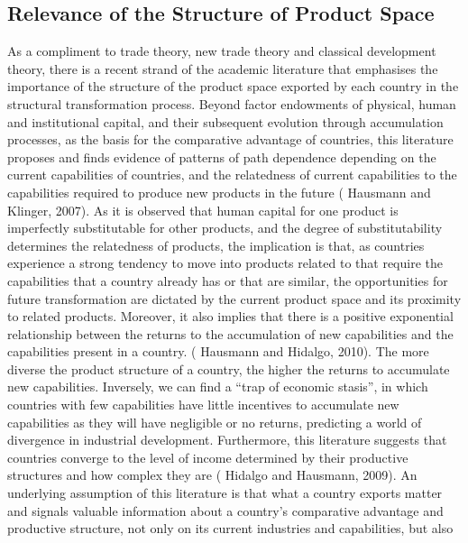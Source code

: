 \documentclass[12pt]{article}%
\begin{document}
%
\subsection{Relevance of the Structure of Product Space}%
\label{subsec:RelevanceoftheStructureofProductSpace}%

%
As a compliment to trade theory, new trade theory and classical
development theory, there is a recent strand of the academic literature
that emphasises the importance of the structure of the product space
exported by each country in the structural transformation process.
Beyond factor endowments of physical, human and institutional capital,
and their subsequent evolution through accumulation processes, as the
basis for the comparative advantage of countries, this literature
proposes and finds evidence of patterns of path dependence depending on
the current capabilities of countries, and the relatedness of current
capabilities to the capabilities required to produce new products in the
future (\cite{hausmann_structure_2007} Hausmann and Klinger, 2007). As it is observed that human
capital for one product is imperfectly substitutable for other products,
and the degree of substitutability determines the relatedness of
products, the implication is that, as countries experience a strong
tendency to move into products related to that require the capabilities
that a country already has or that are similar, the opportunities for
future transformation are dictated by the current product space and its
proximity to related products. Moreover, it also implies that there is a
positive exponential relationship between the returns to the
accumulation of new capabilities and the capabilities present in a
country. (\cite{hausmann_country_2010} Hausmann and Hidalgo, 2010). The more diverse the product
structure of a country, the higher the returns to accumulate new
capabilities. Inversely, we can find a ``trap of economic stasis'', in
which countries with few capabilities have little incentives to
accumulate new capabilities as they will have negligible or no returns,
predicting a world of divergence in industrial development. Furthermore,
this literature suggests that countries converge to the level of income
determined by their productive structures and how complex they are
(\cite{hidalgo_building_2009} Hidalgo and Hausmann, 2009). An underlying assumption of this
literature is that what a country exports matter and signals valuable
information about a country's comparative advantage and productive
structure, not only on its current industries and capabilities, but also
\end{document}
